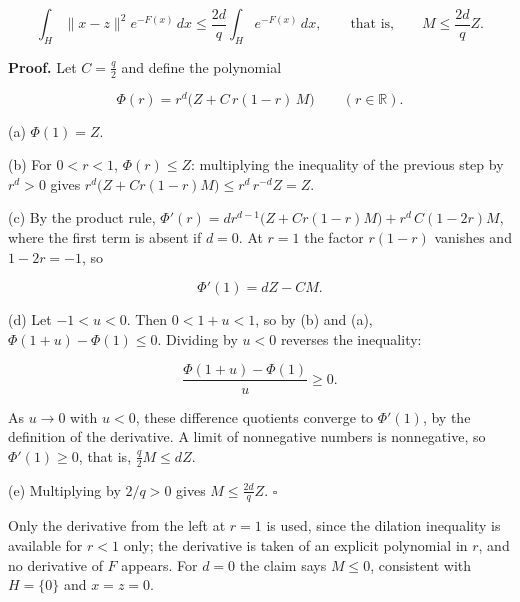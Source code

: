 \documentclass[11pt,a4paper]{article}
\begin{document}
\[\int_H\|x-z\|^2e^{-F(x)}\,dx\le\frac{2d}{q}\int_He^{-F(x)}\,dx,\qquad\text{that is,}\qquad M\le\frac{2d}{q}Z.\]


\textbf{Proof.} Let \(C=\frac q2\) and define the polynomial


\[\Phi(r)=r^d\bigl(Z+C\,r(1-r)\,M\bigr)\qquad(r\in\mathbb R).\]


(a) \(\Phi(1)=Z\).




(b) For \(0<r<1\), \(\Phi(r)\le Z\): multiplying the inequality of the previous step by \(r^d>0\) gives \(r^d\bigl(Z+Cr(1-r)M\bigr)\le r^d\,r^{-d}Z=Z\).




(c) By the product rule, \(\Phi'(r)=dr^{d-1}\bigl(Z+Cr(1-r)M\bigr)+r^d\,C(1-2r)M\), where the first term is absent if \(d=0\). At \(r=1\) the factor \(r(1-r)\) vanishes and \(1-2r=-1\), so


\[\Phi'(1)=dZ-CM.\]


(d) Let \(-1<u<0\). Then \(0<1+u<1\), so by (b) and (a), \(\Phi(1+u)-\Phi(1)\le0\). Dividing by \(u<0\) reverses the inequality:


\[\frac{\Phi(1+u)-\Phi(1)}{u}\ge0.\]


As \(u\to0\) with \(u<0\), these difference quotients converge to \(\Phi'(1)\), by the definition of the derivative. A limit of nonnegative numbers is nonnegative, so \(\Phi'(1)\ge0\), that is, \(\frac q2M\le dZ\).




(e) Multiplying by \(2/q>0\) gives \(M\le\frac{2d}{q}Z\). \(\square\)




Only the derivative from the left at \(r=1\) is used, since the dilation inequality is available for \(r<1\) only; the derivative is taken of an explicit polynomial in \(r\), and no derivative of \(F\) appears. For \(d=0\) the claim says \(M\le0\), consistent with \(H=\{0\}\) and \(x=z=0\).
\end{document}
